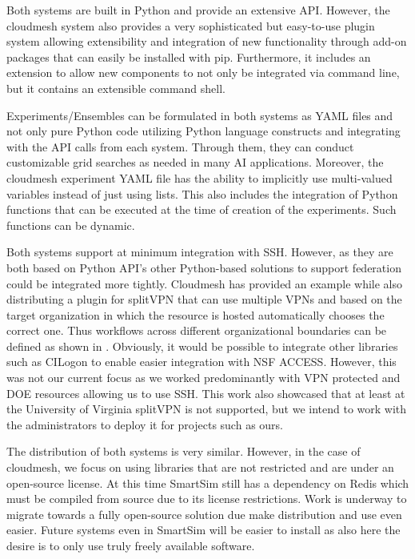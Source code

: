 \documentclass[utf8]{FrontiersinVancouver} %
\begin{document}
Both systems are built in Python and provide an extensive API. However, the cloudmesh system also provides a very sophisticated but easy-to-use plugin system allowing extensibility and integration of new functionality through add-on packages that can easily be installed with pip. Furthermore, it includes an extension to allow new components to not only be integrated via command line, but it contains an extensible command shell.

Experiments/Ensembles can be formulated in both systems as YAML files and not only pure Python code utilizing Python language constructs and integrating with the API calls from each system. Through them, they can conduct customizable grid searches as needed in many AI applications. Moreover, the cloudmesh experiment YAML file has the ability to implicitly use multi-valued variables instead of just using lists. This also includes the integration of Python functions that can be executed at the time of creation of the experiments. Such functions can be dynamic.

Both systems support at minimum integration with SSH. However, as they are both based on Python API's other Python-based solutions to support federation could be integrated more tightly. Cloudmesh has provided an example while also distributing a plugin for splitVPN that can use multiple VPNs and based on the target organization in which the resource is hosted automatically chooses the correct one. Thus workflows  
across different organizational boundaries can be defined as shown in \citep{las-frontiers-edu}. Obviously, it would be possible to integrate other libraries such as
CILogon to enable easier integration with NSF ACCESS. However, this was not our current focus as we worked predominantly with VPN protected and DOE resources allowing us to use SSH. This work also showcased that at least at the University of Virginia splitVPN is not supported, but we intend to work with the administrators to deploy it for projects such as ours.

The distribution of both systems is very similar. However, in the case of cloudmesh, we focus on using libraries that are not restricted and are under an open-source license. At this time SmartSim still has a dependency on Redis which must be compiled from source due to its license restrictions. Work is underway to migrate towards a fully open-source solution due make distribution and use even easier. Future systems even in SmartSim will be easier to install as also here the desire is to only use truly freely available software.
\end{document}
